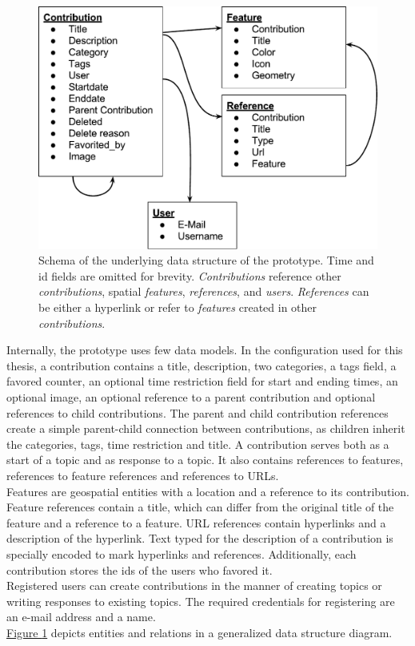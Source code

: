 \begin{figure}[!h]
    \centering
    \includegraphics[width=1\columnwidth]{images/data_structure}
    \caption{Schema of the underlying data structure of the prototype. Time and id fields are omitted for brevity. \textit{Contributions} reference other \textit{contributions}, spatial \textit{features}, \textit{references}, and \textit{users}. \textit{References} can be either a hyperlink or refer to \textit{features} created in other \textit{contributions}.}
    \label{fig:data_structure}
\end{figure}

Internally, the prototype uses few data models. In the configuration used for this thesis, a contribution contains a title, description, two categories, a tags field, a favored counter, an optional time restriction field for start and ending times, an optional image, an optional reference to a parent contribution and optional references to child contributions. The parent and child contribution references create a simple parent-child connection between contributions, as children inherit the categories, tags, time restriction and title. A contribution serves both as a start of a topic and as response to a topic. It also contains references to features, references to feature references and references to URLs.\\
Features are geospatial entities with a location and a reference to its contribution.\\
Feature references contain a title, which can differ from the original title of the feature and a reference to a feature. URL references contain hyperlinks and a description of the hyperlink. Text typed for the description of a contribution is specially encoded to mark hyperlinks and references. Additionally, each contribution stores the ids of the users who favored it.\\
Registered users can create contributions in the manner of creating topics or writing responses to existing topics. The required credentials for registering are an e-mail address and a name.\\
\hyperref[fig:data_structure]{Figure \ref{fig:data_structure}} depicts entities and relations in a generalized data structure diagram.

